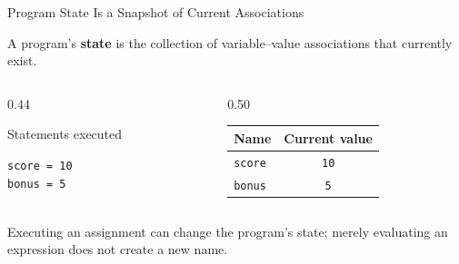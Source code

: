 \documentclass[aspectratio=169,10pt]{beamer}
\begin{document}
\begin{frame}{Program State Is a Snapshot of Current Associations}

  \begin{cpdefinition}

    A program's \textbf{state} is the collection of variable--value associations that currently exist.

  \end{cpdefinition}

  \begin{columns}[T,onlytextwidth]

    \begin{column}{0.44\textwidth}

      \begin{block}{Statements executed}

        \texttt{score = 10}\\
        \texttt{bonus = 5}

      \end{block}

    \end{column}

    \begin{column}{0.50\textwidth}

      \begin{center}
      \begin{tabular}{l|c}
        \textbf{Name} & \textbf{Current value} \\\hline
        \texttt{score} & \texttt{10} \\
        \texttt{bonus} & \texttt{5}
      \end{tabular}
      \end{center}

    \end{column}

  \end{columns}

  \begin{keyidea}

    Executing an assignment can change the program's state; merely evaluating an expression does not create a new name.

  \end{keyidea}

\end{frame}
\end{document}
